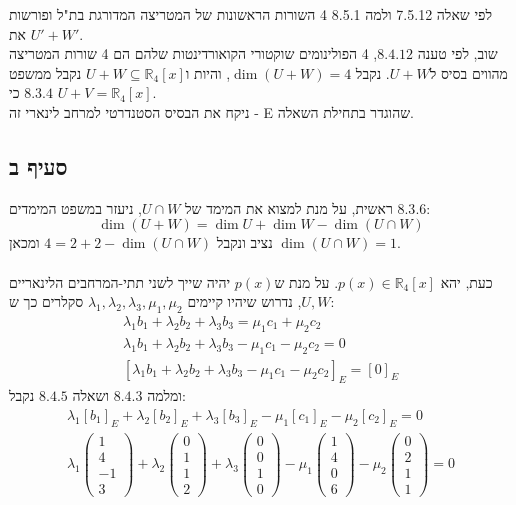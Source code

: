 \documentclass{article}
\def\reals{\mathbb{R}}
\begin{document}
לפי שאלה 7.5.12 ולמה 8.5.1 4 השורות הראשונות של המטריצה המדורגת בת"ל ופורשות את $U'+W'$. \\
שוב, לפי טענה $8.4.12$, 4 הפולינומים שוקטורי הקואורדינטות שלהם הם 4 שורות המטריצה מהווים בסיס ל$U+W$.
נקבל $\dim(U+W)=4$, והיות ו$U+W\subseteq \reals_4[x]$ נקבל ממשפט $8.3.4$ כי $U+V=\reals_4[x]$. \\
ניקח את הבסיס הסטנדרטי למרחב לינארי זה - E שהוגדר בתחילת השאלה.

\subsection*{סעיף ב}

ראשית, על מנת למצוא את המימד של $U\cap W$, ניעזר במשפט המימדים $8.3.6$:
\[
    \dim(U+W)=\dim U + \dim W -\dim(U\cap W)
\]
נציב ונקבל $4=2+2-\dim(U\cap W)$ ומכאן $\dim (U\cap W)=1$.\\\\
כעת, יהא $p(x)\in \reals_4[x]$. על מנת ש$p(x)$ יהיה שייך לשני תתי-המרחבים הלינאריים $U,W$,
נדרוש שיהיו קיימים $\lambda_1, \lambda_2, \lambda_3, \mu_1, \mu_2$ סקלרים כך ש:
\begin{align*}
    \lambda_1b_1+\lambda_2b_2+\lambda_3b_3=\mu_1c_1+\mu_2c_2   \\
    \lambda_1b_1+\lambda_2b_2+\lambda_3b_3-\mu_1c_1-\mu_2c_2=0 \\
    [\lambda_1b_1+\lambda_2b_2+\lambda_3b_3-\mu_1c_1-\mu_2c_2]_E=[0]_E
\end{align*}
ומלמה $8.4.3$ ושאלה $8.4.5$ נקבל:
\begin{align*}
    \lambda_1[b_1]_E+\lambda_2[b_2]_E+\lambda_3[b_3]_E-\mu_1[c_1]_E-\mu_2[c_2]_E=0 \\
    \lambda_1 \begin{pmatrix}
        1  \\
        4  \\
        -1 \\
        3
    \end{pmatrix}+
    \lambda_2\begin{pmatrix}
        0 \\
        1 \\
        1 \\
        2
    \end{pmatrix}+
    \lambda_3\begin{pmatrix}
        0 \\
        0 \\
        1 \\
        0
    \end{pmatrix}-
    \mu_1\begin{pmatrix}
        1 \\
        4 \\
        0 \\
        6
    \end{pmatrix}-
    \mu_2\begin{pmatrix}
        0 \\
        2 \\
        1 \\
        1
    \end{pmatrix}=0
\end{align*}
\end{document}
